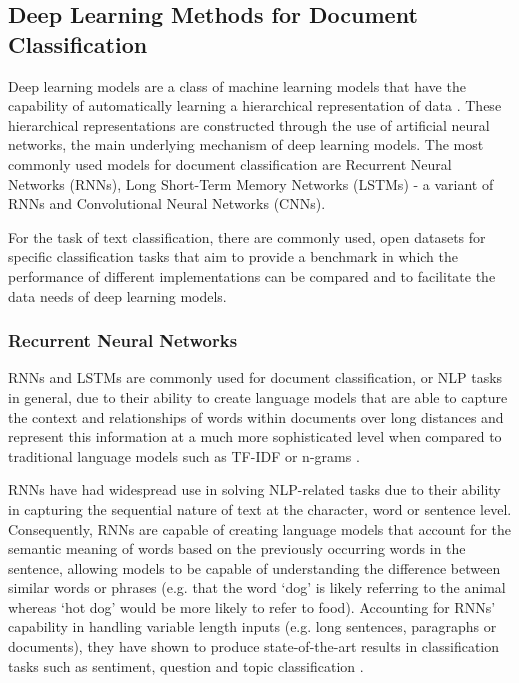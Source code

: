 \documentclass[a4paper,twoside,phd]{BYUPhys}
\begin{document}
\subsection{Deep Learning Methods for Document Classification}
\label{sec:DLDocumentClassification}

Deep learning models are a class of machine learning models that have the capability of automatically learning a hierarchical representation of data \cite{Basheer2000}. These hierarchical representations are constructed through the use of artificial neural networks, the main underlying mechanism of deep learning models. The most commonly used models for document classification are Recurrent Neural Networks (RNNs), Long Short-Term Memory Networks (LSTMs) - a variant of RNNs and Convolutional Neural Networks (CNNs). \newline

For the task of text classification, there are commonly used, open datasets for specific classification tasks that aim to provide a benchmark in which the performance of different implementations can be compared and to facilitate the data needs of deep learning models. 

\subsubsection{Recurrent Neural Networks}
\label{sec:RNN}

RNNs and LSTMs are commonly used for document classification, or NLP tasks in general, due to their ability to create language models that are able to capture the context and relationships of words within documents over long distances and represent this information at a much more sophisticated level when compared to traditional language models such as TF-IDF or n-grams \cite{Young}. \newline
 
RNNs have had widespread use in solving NLP-related tasks due to their ability in capturing the sequential nature of text at the character, word or sentence level. Consequently, RNNs are capable of creating language models that account for the semantic meaning of words based on the previously occurring words in the sentence, allowing models to be capable of understanding the difference between similar words or phrases (e.g. that the word `dog' is likely referring to the animal whereas `hot dog' would be more likely to refer to food). Accounting for RNNs' capability in handling variable length inputs (e.g. long sentences, paragraphs or documents), they have shown to produce state-of-the-art results in classification tasks such as sentiment, question and topic classification \cite{Howard2018}.\newline
\end{document}
